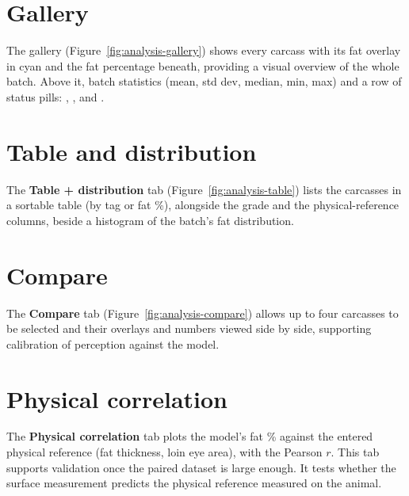 \section{Gallery}

The gallery (Figure~\ref{fig:analysis-gallery}) shows every carcass with its fat
overlay in cyan and the fat percentage beneath, providing a visual overview of
the whole batch. Above it, batch statistics (mean, std dev, median, min, max) and
a row of status pills: ,
, and .


\section{Table and distribution}

The \textbf{Table + distribution} tab (Figure~\ref{fig:analysis-table}) lists the
carcasses in a sortable table (by tag or fat \%), alongside the grade and the
physical-reference columns, beside a histogram of the batch's fat distribution.


\section{Compare}

The \textbf{Compare} tab (Figure~\ref{fig:analysis-compare}) allows up to four
carcasses to be selected and their overlays and numbers viewed side by side,
supporting calibration of perception against the model.


\section{Physical correlation}

The \textbf{Physical correlation} tab plots the model's fat \% against the entered
physical reference (fat thickness, loin eye area), with the Pearson $r$. This tab
supports validation once the paired dataset is large enough. It tests whether the
surface measurement predicts the physical reference measured on the animal.
